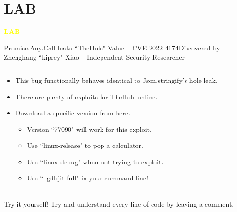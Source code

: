 \section{LAB}
\begin{frame}{}
    \centering
        \Huge\bfseries
    \textcolor{yellow}{LAB}
\end{frame}

\begin{frame}{Promise.Any.Call leaks ``TheHole" Value -- CVE-2022-4174}{Discovered by Zhenghang ``kiprey" Xiao -- Independent Security Researcher}
    \begin{columns}
        \begin{column}{0.55\textwidth}
            \begin{itemize}
                \item This bug functionally behaves identical to Json.stringify's hole leak.
                \item There are plenty of exploits for TheHole online. 
                \item Download a specific version from \href{https://commondatastorage.googleapis.com/v8-asan/index.html}{\color{pink}here}.
                    \begin{itemize}
                        \item Version ``77090" will work for this exploit.
                        \item Use ``linux-release" to pop a calculator.
                        \item Use ``linux-debug" when not trying to exploit.
                        \item Use ``--gdbjit-full" in your command line! 
                    \end{itemize}
            \end{itemize}
        \href{https://bugs.chromium.org/p/chromium/issues/detail?id=1379054}{\color{pink}{crbug-1379054}} \\
        Try it yourself! Try and understand every line of code by leaving a comment. 
        \end{column}
        \begin{column}{0.4\textwidth}
            \inputminted{js}{code/promise.tex}
        \end{column}
    \end{columns}
\end{frame}
